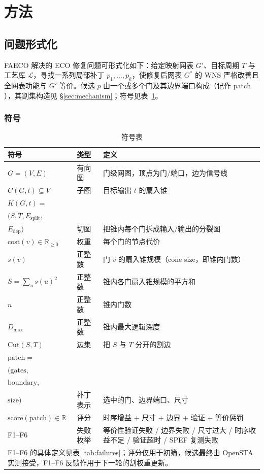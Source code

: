 \documentclass[journal]{IEEEtran}
\begin{document}
\section{方法}

\subsection{问题形式化}
FAECO 解决的 ECO 修复问题可形式化如下：给定映射网表 $G'$、目标周期 $T$ 与工艺库 $\mathcal{L}$，寻找一系列局部补丁 $p_1,\dots,p_k$，使修复后网表 $G^*$ 的 WNS 严格改善且全网表功能与 $G'$ 等价。候选 $p$ 由一个或多个门及其边界端口构成（记作 $\mathrm{patch}$），其割集构造见 \S\ref{sec:mechanism}；符号见表~\ref{tab:symbols}。

\subsubsection{符号}
\begin{table}[!t]
\centering
\caption{符号表}
\label{tab:symbols}
\scriptsize
\setlength{\tabcolsep}{2pt}
\begin{tabular}{p{3.4cm}p{1.5cm}p{3.4cm}}
\toprule
\textbf{符号} & \textbf{类型} & \textbf{定义} \\
\midrule
$G = (V, E)$ & 有向图 & 门级网图，顶点为门/端口，边为信号线 \\
$C(G, t) \subseteq V$ & 子图 & 目标输出 $t$ 的扇入锥 \\
$K(G, t) =$ \\
$(S, T, E_{\mathrm{split}},$ \\
$E_{\mathrm{dep}})$ & 切图 & 把锥内每个门拆成输入/输出的分裂图 \\
$\mathrm{cost}(v) \in \mathbb{R}_{\geq 0}$ & 权重 & 每个门的节点代价 \\
$s(v)$ & 正整数 & 门 $v$ 的扇入锥规模（cone size，即锥内门数）\\
$S = \sum_u s(u)^2$ & 正整数 & 锥内各门扇入锥规模的平方和 \\
$n$ & 正整数 & 锥内门数 \\
$D_{\max}$ & 正整数 & 锥内最大逻辑深度 \\
$\mathrm{Cut}(S, T)$ & 边集 & 把 $S$ 与 $T$ 分开的割边 \\
$\mathrm{patch} =$ \\
$(\mathrm{gates},$ \\
$\mathrm{boundary},$ \\
$\mathrm{size})$ & 补丁表示 & 选中的门、边界端口、尺寸 \\
$\mathrm{score}(\mathrm{patch}) \in \mathbb{R}$ & 评分 & 时序增益 + 尺寸 + 边界 + 验证 + 等价惩罚 \\
F1--F6 & 失败枚举 & 等价性验证失败 / 边界失败 / 尺寸过大 / 时序收益不足 / 验证超时 / SPEF 复测失败 \\
\bottomrule
\multicolumn{3}{p{8.0cm}}{\footnotesize F1--F6 的具体定义见表 \ref{tab:failures}；评分仅用于初筛，候选最终由 OpenSTA 实测接受，F1--F6 反馈作用于下一轮的割权重更新。}\\
\end{tabular}
\end{table}
\end{document}
